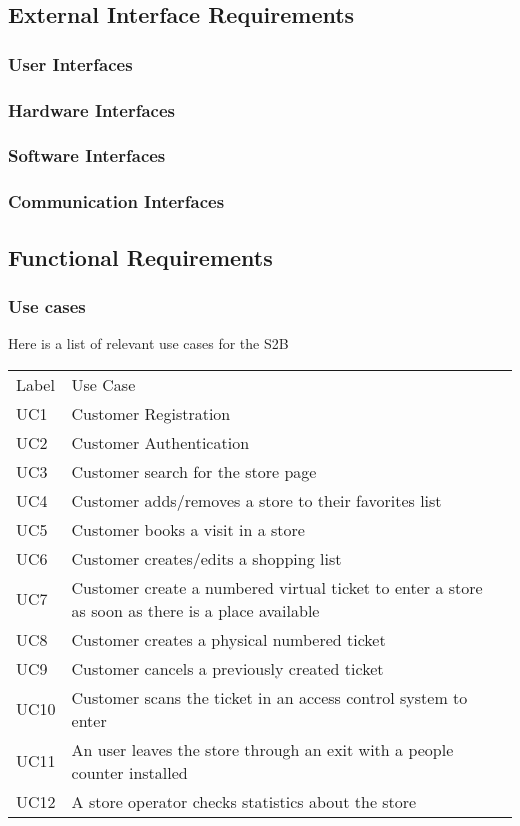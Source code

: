 \subsection{External Interface Requirements}
\subsubsection{User Interfaces}
\subsubsection{Hardware Interfaces}
\subsubsection{Software Interfaces}
\subsubsection{Communication Interfaces}
\subsection{Functional Requirements}
\subsubsection{Use cases}
    Here is a list of relevant use cases for the S2B
    \smallskip
    
    \renewcommand{\arraystretch}{1.4}
    \begin{tabular}{C{2cm}L{10.5cm}C{2.6cm}}
        Label & Use Case       \\
        UC1 & Customer Registration \\
        UC2 & Customer Authentication \\
        UC3 & Customer search for the store page\\
        UC4 & Customer adds/removes a store to their favorites list\\
        UC5 & Customer books a visit in a store \\
        UC6 & Customer creates/edits a shopping list \\
        UC7 & Customer create a numbered virtual ticket to enter a store as soon as there is a place available \\
        UC8 & Customer creates a physical numbered ticket \\
        UC9 & Customer cancels a previously created ticket \\
        UC10 & Customer scans the ticket in an access control system to enter \\
        UC11 & An user leaves the store through an exit with a people counter installed \\
        UC12 & A store operator checks statistics about the store\\

    \end{tabular}
    

